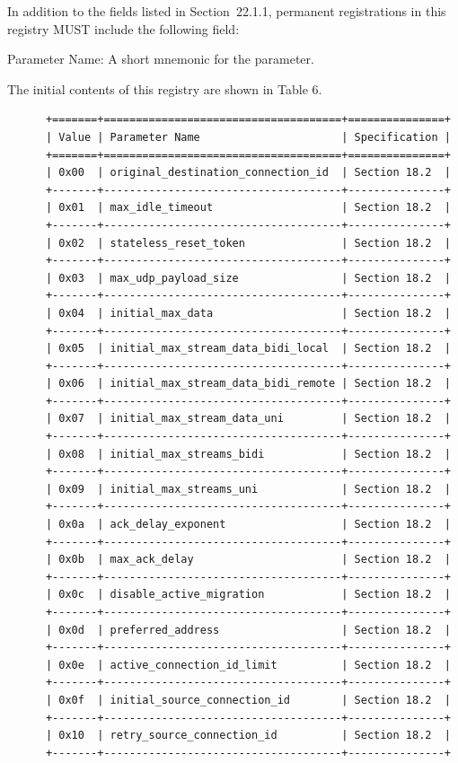 \documentclass{article}
\begin{document}
In addition to the fields listed in Section~22.1.1, permanent registrations in this registry MUST include the following field:

Parameter Name:  A short mnemonic for the parameter.

The initial contents of this registry are shown in Table 6.

\begin{verbatim}
      +=======+=====================================+===============+
      | Value | Parameter Name                      | Specification |
      +=======+=====================================+===============+
      | 0x00  | original_destination_connection_id  | Section 18.2  |
      +-------+-------------------------------------+---------------+
      | 0x01  | max_idle_timeout                    | Section 18.2  |
      +-------+-------------------------------------+---------------+
      | 0x02  | stateless_reset_token               | Section 18.2  |
      +-------+-------------------------------------+---------------+
      | 0x03  | max_udp_payload_size                | Section 18.2  |
      +-------+-------------------------------------+---------------+
      | 0x04  | initial_max_data                    | Section 18.2  |
      +-------+-------------------------------------+---------------+
      | 0x05  | initial_max_stream_data_bidi_local  | Section 18.2  |
      +-------+-------------------------------------+---------------+
      | 0x06  | initial_max_stream_data_bidi_remote | Section 18.2  |
      +-------+-------------------------------------+---------------+
      | 0x07  | initial_max_stream_data_uni         | Section 18.2  |
      +-------+-------------------------------------+---------------+
      | 0x08  | initial_max_streams_bidi            | Section 18.2  |
      +-------+-------------------------------------+---------------+
      | 0x09  | initial_max_streams_uni             | Section 18.2  |
      +-------+-------------------------------------+---------------+
      | 0x0a  | ack_delay_exponent                  | Section 18.2  |
      +-------+-------------------------------------+---------------+
      | 0x0b  | max_ack_delay                       | Section 18.2  |
      +-------+-------------------------------------+---------------+
      | 0x0c  | disable_active_migration            | Section 18.2  |
      +-------+-------------------------------------+---------------+
      | 0x0d  | preferred_address                   | Section 18.2  |
      +-------+-------------------------------------+---------------+
      | 0x0e  | active_connection_id_limit          | Section 18.2  |
      +-------+-------------------------------------+---------------+
      | 0x0f  | initial_source_connection_id        | Section 18.2  |
      +-------+-------------------------------------+---------------+
      | 0x10  | retry_source_connection_id          | Section 18.2  |
      +-------+-------------------------------------+---------------+
\end{verbatim}
\end{document}
